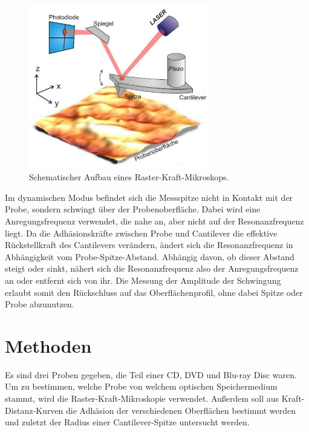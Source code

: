 \documentclass[
	a4paper,
	12pt,
	pagesize,
	ngerman
]{scrartcl}
\begin{document}
	\begin{figure}[H]
		\includegraphics[width=0.7\textwidth]{images/sonstiges/Aufbau}
		\centering
		\caption{Schematischer Aufbau eines Raster-Kraft-Mikroskops. \cite{Anleitung}}
		\label{fig_Aufbau}
		\centering
	\end{figure}
	Im dynamischen Modus befindet sich die Messspitze nicht in Kontakt mit der Probe, sondern schwingt über der Probenoberfläche.
	Dabei wird eine Anregungsfrequenz verwendet, die nahe an, aber nicht auf der Resonanzfrequenz liegt. %
	Da die Adhäsionskräfte zwischen Probe und Cantilever die effektive Rückstellkraft des Cantilevers verändern, ändert sich die Resonanzfrequenz in Abhängigkeit vom Probe-Spitze-Abstand.
	Abhängig davon, ob dieser Abstand steigt oder sinkt, nähert sich die Resonanzfrequenz also der Anregungsfrequenz an oder entfernt sich von ihr.
	Die Messung der Amplitude der Schwingung erlaubt somit den Rückschluss auf das Oberflächenprofil, ohne dabei Spitze oder Probe abzunutzen.

	\section{Methoden}
	\label{sec_methoden}
	Es sind drei Proben gegeben, die Teil einer CD, DVD und Blu-ray Disc waren.
	Um zu bestimmen, welche Probe von welchem optischen Speichermedium stammt, wird die Raster-Kraft-Mikroskopie verwendet.
	Außerdem soll aus Kraft-Distanz-Kurven die Adhäsion der verschiedenen Oberflächen bestimmt werden und zuletzt der Radius einer Cantilever-Spitze untersucht werden. %
\end{document}

